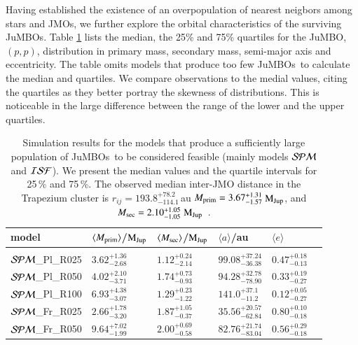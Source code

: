 \documentclass[submission,phys]{lib/SciPost}
\newcommand{\MJup}{\mbox{$\mathrm{{M}}_{\rm Jup}$}}
\newcommand{\jumbos}{\mbox{JuMBOs}}
\begin{document}
Having established the existence of an overpopulation of nearest
neigbors among stars and JMOs, we further explore the orbital
characteristics of the surviving \jumbos.  Table
\ref{Tab:orbital_distributions} lists the median, the 25\% and 75\%
quartiles for the JuMBO, $(p,p)$, distribution in primary mass,
secondary mass, semi-major axis and eccentricity. The table omits
models that produce too few \jumbos\, to calculate the median and
quartiles. We compare observations to the medial values, citing the
quartiles as they better portray the skewness of distributions.  This
is noticeable in the large difference between the range of the lower
and the upper quartiles.


\begin{table}
  \caption{Simulation results for the models that produce a
    sufficiently large population of \jumbos\, to be considered
    feasible (mainly models ${\cal SPM}$ and ${\cal ISF}$). We present
    the median values and the quartile intervals for 25\,\% and
    75\,\%.  The observed median inter-JMO distance in the Trapezium
    cluster is $r_{ij} = 193.8^{+78.2}_{-114.1}$\,au $M_{\rm prim} =
    3.67^{+1.31}_{-1.57}$\,\MJup, and $M_{\rm sec} =
    2.10^{+1.05}_{-1.05}$\,\MJup\, \cite{2023arXiv231001231P}.  }
\label{Tab:orbital_distributions}
 \centering 
 \begin{tabular}{llllll}
 \hline\hline
model&$\langle M_{\rm prim} \rangle$/\MJup & $\langle M_{\rm sec} \rangle$/\MJup & $\langle a \rangle$/au & $\langle e \rangle$ \\
 \hline \vspace{-0.75em} \\ 
 ${\cal SPM}$\_Pl\_R025 & $3.62^{+1.36}_{-2.68}$ & $1.12^{+0.24}_{-2.14}$ & $99.08^{+37.24}_{-36.38}$ & $0.47^{+0.18}_{-0.13}$ \vspace{0.25em}\\
 ${\cal SPM}$\_Pl\_R050 & $4.02^{+2.10}_{-3.71}$ & $1.74^{+0.73}_{-0.93}$ & $94.28^{+32.78}_{-78.90}$ & $0.33^{+0.19}_{-0.27}$ \vspace{0.25em}\\  
 ${\cal SPM}$\_Pl\_R100 & $6.93^{+4.38}_{-3.07}$ & $1.29^{+0.23}_{-1.22}$ & $141.0^{+37.1}_{-11.2}$ & $0.12^{+0.05}_{-0.27}$ \vspace{0.25em}\\
 ${\cal SPM}$\_Fr\_R025 & $2.66^{+1.78}_{-3.20}$ & $1.87^{+1.05}_{-0.37}$ & $35.56^{+20.57}_{-62.84}$ & $0.80^{+0.10}_{-0.18}$ \vspace{0.25em}\\ 
 ${\cal SPM}$\_Fr\_R050 & $9.64^{+7.02}_{-1.99}$ & $2.00^{+0.69}_{-0.58}$ & $82.76^{+21.74}_{-83.04}$ & $0.56^{+0.29}_{-0.18}$ \vspace{0.25em}\\ 

\end{tabular}
\end{table}
\end{document}
